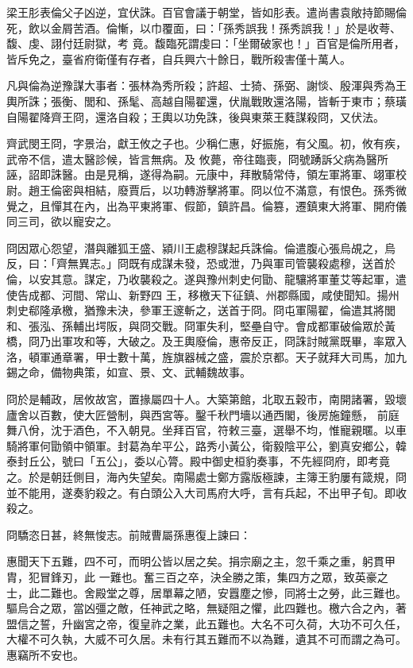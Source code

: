 \begin{pinyinscope}
 梁王肜表倫父子凶逆，宜伏誅。百官會議于朝堂，皆如肜表。遣尚書袁敞持節賜倫死，飲以金屑苦酒。倫慚，以巾覆面，曰：「孫秀誤我！孫秀誤我！」於是收荂、馥、虔、詡付廷尉獄，考
 竟。馥臨死謂虔曰：「坐爾破家也！」百官是倫所用者，皆斥免之，臺省府衛僅有存者，自兵興六十餘日，戰所殺害僅十萬人。



 凡與倫為逆豫謀大事者：張林為秀所殺；許超、士猗、孫弼、謝惔、殷渾與秀為王輿所誅；張衡、閭和、孫髦、高越自陽翟還，伏胤戰敗還洛陽，皆斬于東市；蔡璜自陽翟降齊王冏，還洛自殺；王輿以功免誅，後與東萊王蕤謀殺冏，又伏法。



 齊武閔王冏，字景治，獻王攸之子也。少稱仁惠，好振施，有父風。初，攸有疾，武帝不信，遣太醫診候，皆言無病。及
 攸薨，帝往臨喪，冏號踴訴父病為醫所誣，詔即誅醫。由是見稱，遂得為嗣。元康中，拜散騎常侍，領左軍將軍、翊軍校尉。趙王倫密與相結，廢賈后，以功轉游擊將軍。冏以位不滿意，有恨色。孫秀微覺之，且憚其在內，出為平東將軍、假節，鎮許昌。倫篡，遷鎮東大將軍、開府儀同三司，欲以寵安之。



 冏因眾心怨望，潛與離狐王盛、潁川王處穆謀起兵誅倫。倫遣腹心張烏覘之，烏反，曰：「齊無異志。」冏既有成謀未發，恐或泄，乃與軍司管襲殺處穆，送首於倫，以安其意。謀定，乃收襲殺之。遂與豫州刺史何勖、龍驤將軍董艾等起軍，遣使告成都、河間、常山、新野四
 王，移檄天下征鎮、州郡縣國，咸使聞知。揚州刺史郗隆承檄，猶豫未決，參軍王邃斬之，送首于冏。冏屯軍陽翟，倫遣其將閭和、張泓、孫輔出堮阪，與冏交戰。冏軍失利，堅壘自守。會成都軍破倫眾於黃橋，冏乃出軍攻和等，大破之。及王輿廢倫，惠帝反正，冏誅討賊黨既畢，率眾入洛，頓軍通章署，甲士數十萬，旌旗器械之盛，震於京都。天子就拜大司馬，加九錫之命，備物典策，如宣、景、文、武輔魏故事。



 冏於是輔政，居攸故宮，置掾屬四十人。大築第館，北取五穀市，南開諸署，毀壞廬舍以百數，使大匠營制，與西宮等。鑿千秋門墻以通西閣，後房施鐘懸，
 前庭舞八佾，沈于酒色，不入朝見。坐拜百官，符敕三臺，選舉不均，惟寵親暱。以車騎將軍何勖領中領軍。封葛為牟平公，路秀小黃公，衛毅陰平公，劉真安鄉公，韓泰封丘公，號曰「五公」，委以心膂。殿中御史桓豹奏事，不先經冏府，即考竟之。於是朝廷側目，海內失望矣。南陽處士鄭方露版極諫，主簿王豹屢有箴規，冏並不能用，遂奏豹殺之。有白頭公入大司馬府大呼，言有兵起，不出甲子旬。即收殺之。



 冏驕恣日甚，終無悛志。前賊曹屬孫惠復上諫曰：



 惠聞天下五難，四不可，而明公皆以居之矣。捐宗廟之主，忽千乘之重，躬貫甲胄，犯冒鋒刃，此
 一難也。奮三百之卒，決全勝之策，集四方之眾，致英豪之士，此二難也。舍殿堂之尊，居單幕之陋，安囂塵之慘，同將士之勞，此三難也。驅烏合之眾，當凶彊之敵，任神武之略，無疑阻之懼，此四難也。檄六合之內，著盟信之誓，升幽宮之帝，復皇祚之業，此五難也。大名不可久荷，大功不可久任，大權不可久執，大威不可久居。未有行其五難而不以為難，遺其不可而謂之為可。惠竊所不安也。




\end{pinyinscope}
